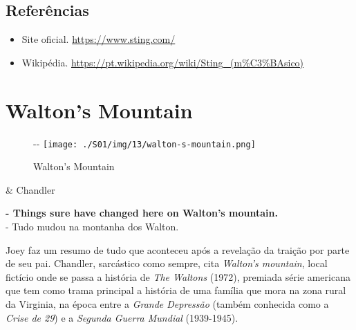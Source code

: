 \hypertarget{referuxeancias-3}{%
\subsection{Referências}\label{referuxeancias-3}}

\begin{itemize}
\tightlist
\item
  \sloppy Site oficial. \url{https://www.sting.com/}
\item
  \sloppy Wikipédia. \url{https://pt.wikipedia.org/wiki/Sting_(m%C3%BAsico)}
\end{itemize}

\hypertarget{waltons-mountain}{%
\section{Walton's Mountain}\label{waltons-mountain}}

\begin{figure}[!ht]
  \begin{adjustwidth}{-\oddsidemargin-1in}{-\rightmargin}
    \centering
    \texttt{[image: ./S01/img/13/walton-s-mountain.png]}
    \caption{Walton’s Mountain\label{fig:walton-s-mountain}}
  \end{adjustwidth}
\end{figure}

\begin{tcolorbox}[enhanced,center upper,
    drop fuzzy shadow southeast, boxrule=0.3pt,
    lower separated=false,
    colframe=black!30!dialogoBorder,colback=white]
\begin{minipage}[c]{0.16\linewidth}
   & \centering \scriptsize{Chandler}
\end{minipage}
\hfill
\begin{minipage}[c]{0.8\linewidth}
  \textbf{- Things sure have changed here on Walton's mountain.}\\
  - Tudo mudou na montanha dos Walton.
\end{minipage}
\end{tcolorbox}

Joey faz um resumo de tudo que aconteceu após a revelação da traição por
parte de seu pai. Chandler, sarcástico como sempre, cita \emph{Walton's
mountain}, local fictício onde se passa a história de \emph{The Waltons}
(1972), premiada série americana que tem como trama principal a história
de uma família que mora na zona rural da Virginia, na época entre a
\emph{Grande Depressão} (também conhecida como a \emph{Crise de 29}) e a
\emph{Segunda Guerra Mundial} (1939-1945).

